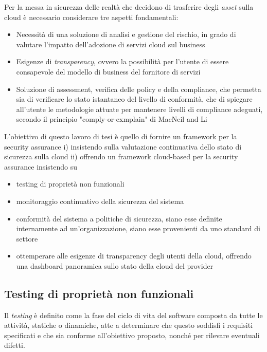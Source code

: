 \documentclass[../main.tex]{subfiles}
\begin{document}
Per la messa in sicurezza delle realtà che decidono di trasferire degli \textit{asset} sulla cloud è necessario considerare tre aspetti fondamentali:
\begin{itemize}
    \item Necessità di una soluzione di analisi e gestione del rischio, in grado di valutare l'impatto dell'adozione di servizi cloud sul business
    \item Esigenze di \textit{transparency}, ovvero la possibilità per l'utente di essere consapevole del modello di business del fornitore di servizi 
    \item Soluzione di assessment, verifica delle policy e della compliance, che permetta sia di verificare lo stato istantaneo del livello di conformità, che di spiegare all'utente le metodologie attuate per mantenere livelli di compliance adeguati, secondo il principio "comply-or-exmplain" di MacNeil and Li \cite{RePEc:bla:corgov:v:14:y:2006:i:5:p:486-496}
\end{itemize}

L'obiettivo di questo lavoro di tesi è quello di fornire un framework per la security assurance i) insistendo sulla valutazione continuativa dello stato di sicurezza sulla cloud ii) offrendo un framework cloud-based per la security assurance insistendo su
\begin{itemize}
    \item testing di proprietà non funzionali
    \item monitoraggio continuativo della sicurezza del sistema
    \item conformità del sistema a politiche di sicurezza, siano esse definite internamente ad un'organizzazione, siano esse provenienti da uno standard di settore 
    \item ottemperare alle esigenze di transparency degli utenti della cloud, offrendo una dashboard panoramica sullo stato della cloud del provider
\end{itemize}

\subsection{Testing di proprietà non funzionali}

Il \textit{testing} è definito come la fase del ciclo di vita del software composta da tutte le attività, statiche o dinamiche, atte a determinare che questo soddisfi i requisiti specificati e che sia conforme all'obiettivo proposto, nonché per rilevare eventuali difetti.
\end{document}
